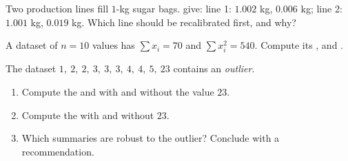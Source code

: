 \begin{exercise}[$\star\star$]\label{exo:g11:stat:8}
Two production lines fill $1$-kg sugar bags.  give:
line 1:  $1.002$ kg,  $0.006$ kg; line 2: 
$1.001$ kg,  $0.019$ kg. Which line should be
recalibrated first, and why?
\end{exercise}

\begin{exercise}[$\star\star$]\label{exo:g11:stat:9}
A dataset of $n = 10$ values has $\sum x_i = 70$ and
$\sum x_i^2 = 540$. Compute its ,  and .
\end{exercise}

\begin{exercise}[$\star\star\star$]\label{exo:g11:stat:10}
The dataset $1,\ 2,\ 2,\ 3,\ 3,\ 3,\ 4,\ 4,\ 5,\ 23$ contains an
\emph{outlier}.
\begin{enumerate}
  \item Compute the  and  with and without the value $23$.
  \item Compute the  with and without $23$.
  \item Which summaries are robust to the outlier? Conclude with a
        recommendation.
\end{enumerate}
\end{exercise}
